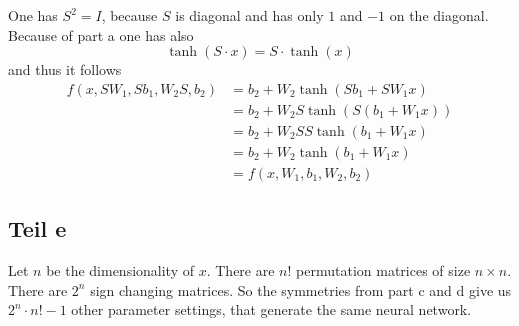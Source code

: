 \documentclass[10pt,a4paper]{article}
\begin{document}
One has $S^{2} = I$, because $S$ is diagonal and has only $1$ and $-1$ on the
diagonal. Because of part a one has also
\begin{equation}
  \tanh(S \cdot x) = S \cdot \tanh(x)
\end{equation}
and thus it follows
\begin{align*}
  f(x, SW_{1}, Sb_{1}, W_{2}S, b_{2}) & = b_{2} + W_{2} \tanh(Sb_{1} + SW_{1}x)\\
                                     & = b_{2} + W_{2} S \tanh(S(b_{1} + W_{1}x))\\
                                     & = b_{2} + W_{2} SS \tanh(b_{1} + W_{1}x)\\
                                     & = b_{2} + W_{2} \tanh(b_{1} + W_{1}x)\\
                                     & = f(x, W_{1}, b_{1}, W_{2}, b_{2})
\end{align*}

\subsection{Teil e}

Let $n$ be the dimensionality of $x$. There are $n!$ permutation matrices of
size $n \times n$. There are $2^{n}$ sign changing matrices. So the symmetries
from part c and d give us $2^{n} \cdot n! - 1$ other parameter settings, that
generate the same neural network.
\end{document}
